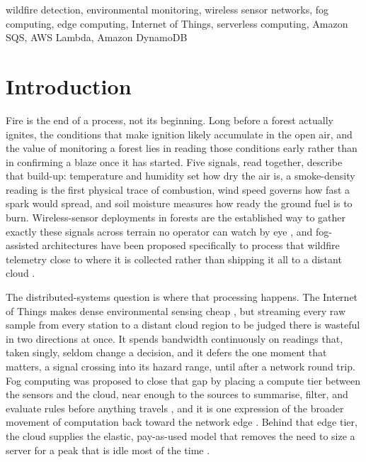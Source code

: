 \documentclass[conference]{IEEEtran}
\begin{document}
\begin{IEEEkeywords}
wildfire detection, environmental monitoring, wireless sensor networks, fog computing, edge computing, Internet of Things, serverless computing, Amazon SQS, AWS Lambda, Amazon DynamoDB
\end{IEEEkeywords}

\section{Introduction}

Fire is the end of a process, not its beginning. Long before a forest actually ignites, the conditions that make ignition likely accumulate in the open air, and the value of monitoring a forest lies in reading those conditions early rather than in confirming a blaze once it has started. Five signals, read together, describe that build-up: temperature and humidity set how dry the air is, a smoke-density reading is the first physical trace of combustion, wind speed governs how fast a spark would spread, and soil moisture measures how ready the ground fuel is to burn. Wireless-sensor deployments in forests are the established way to gather exactly these signals across terrain no operator can watch by eye \cite{aslan2012}, and fog-assisted architectures have been proposed specifically to process that wildfire telemetry close to where it is collected rather than shipping it all to a distant cloud \cite{kaur2019}.

The distributed-systems question is where that processing happens. The Internet of Things makes dense environmental sensing cheap \cite{atzori2010}, but streaming every raw sample from every station to a distant cloud region to be judged there is wasteful in two directions at once. It spends bandwidth continuously on readings that, taken singly, seldom change a decision, and it defers the one moment that matters, a signal crossing into its hazard range, until after a network round trip. Fog computing was proposed to close that gap by placing a compute tier between the sensors and the cloud, near enough to the sources to summarise, filter, and evaluate rules before anything travels \cite{bonomi2012, yousefpour2019}, and it is one expression of the broader movement of computation back toward the network edge \cite{shi2016, satyanarayanan2017}. Behind that edge tier, the cloud supplies the elastic, pay-as-used model that removes the need to size a server for a peak that is idle most of the time \cite{armbrust2010}.
\end{document}
